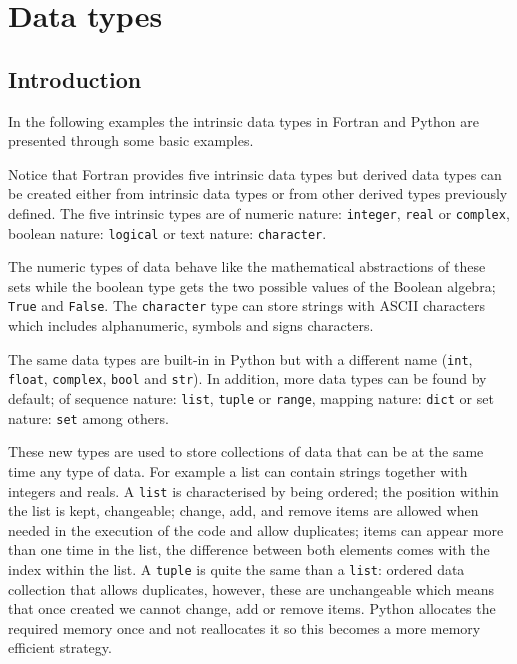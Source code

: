 \chapter{Data types} 
 
    \section{Introduction}

In the following examples the intrinsic data types in Fortran and Python are presented through some basic examples. 

Notice that Fortran provides five intrinsic data types but derived data types can be created either from intrinsic data types or from other derived types previously defined.
The five intrinsic types are of numeric nature: \texttt{integer}, \texttt{real} or \texttt{complex}, boolean nature: \texttt{logical} or text nature: \texttt{character}.

The numeric types of data behave like the mathematical abstractions of these sets while the boolean type gets the two possible values of the Boolean algebra; \texttt{True} and \texttt{False}. 
The \texttt{character} type can store strings with ASCII characters which includes alphanumeric, symbols and signs characters.   

The same data types are built-in in Python but with a different name (\texttt{int}, \texttt{float}, \texttt{complex}, \texttt{bool} and \texttt{str}). 
In addition, more data types can be found by default; of sequence nature: \texttt{list}, \texttt{tuple} or \texttt{range}, mapping nature: \texttt{dict} or set nature: \texttt{set} among others. 

These new types are used to store collections of data that can be at the same time any type of data. For example a list can contain strings together with integers and reals. 
A \texttt{list} is characterised by being ordered; the position within the list is kept, changeable; change, add, and remove items are allowed when needed in the execution of the code and allow duplicates; items can appear more than one time in the list, the difference between both elements comes with the index within the list. 
A \texttt{tuple} is quite the same than a \texttt{list}: ordered data collection that allows duplicates, however, these are unchangeable which means that once created we cannot change, add or remove items. 
Python allocates the required memory once and not reallocates it so this becomes a more memory efficient strategy.

